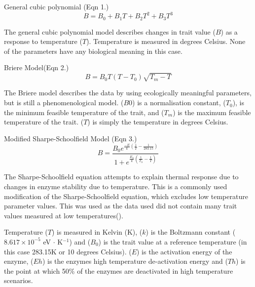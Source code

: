 \documentclass[11pt]{article}
\begin{document}
General cubic polynomial (Eqn 1.)
\begin{equation}
    B = B_0 + B_1 T + B_2 T^2 + B_3 T^3
\end{equation}

The general cubic polynomial model describes changes in trait value ($B$) as a response to temperature ($T$). Temperature is measured in degrees Celsius. None of the parameters have any biological meaning in this case. 

Briere Model(Eqn 2.)
\begin{equation}
    B = B_0 T (T-T_0) \sqrt{T_m-T}
\end{equation}

The Briere model describes the data by using ecologically meaningful parameters, but is still a phenomenological model. ($B0$) is a normalisation constant, ($T_0$), is the minimum feasible temperature of the trait, and ($T_m$) is the maximum feasible temperature of the trait. ($T$) is simply the temperature in degrees Celsius.  

Modified Sharpe-Schoolfield Model
(Eqn 3.)
\begin{equation}
     B = \frac{B_0 e^{\frac{-E}{k} (\frac{1}{T} - \frac{1}{283.15})}} { 1 + e^{\frac{E_h}{k} (\frac{1}{T_h} - \frac{1}{T})}}
\end{equation} 

The Sharpe-Schoolfield equation attempts to explain thermal response due to changes in enzyme stability due to temperature. This is a commonly used modification of the Sharpe-Schoolfield equation, which excludes low temperature parameter values. This was used as the data used did not contain many trait values measured at low temperatures(\cite{Schoolfield1981}). 

Temperature ($T$) is measured in Kelvin (K), ($k$) is the Boltzmann constant ($8.617 \times 10^{-5}$ eV $\cdot$ K$^{-1}$) and ($B_0$) is the trait value at a reference temperature (in this case 283.15K or 10 degrees Celsius). ($E$) is the activation energy of the enzyme, ($Eh$) is the enzymes high temperature de-activation energy and ($Th$) is the point at which 50\% of the enzymes are deactivated in high temperature scenarios.
 
\end{document}
